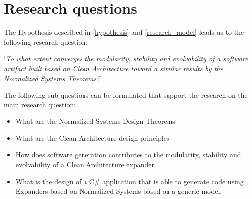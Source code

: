\section{Research questions} \label{sec:research_questions}
The Hypothesis described in \ref{hypothesis} and \ref{research_model} leads us to the
following research question:

\begin{center}
    \enquote*{\textit{To what extent converges the modularity, stability and evolvability
    of a software artifact built based on Clean Architecture toward a
    similar results by the Normalized Systems Theorems?}}
\end{center}

The following sub-questions can be formulated that support the research on the main
research question:
\begin{itemize}
    \item What are the Normalized Systems Design Theorems
    \item What are the Clean Architecture design principles
    \item How does software generation contributes to the modularity, stability and
    evolvability of a Clean Architecture expander
    \item What is the design of a C\# application that is able to generate code using
    Expanders based on Normalized Systems based on a generic model.
\end{itemize}